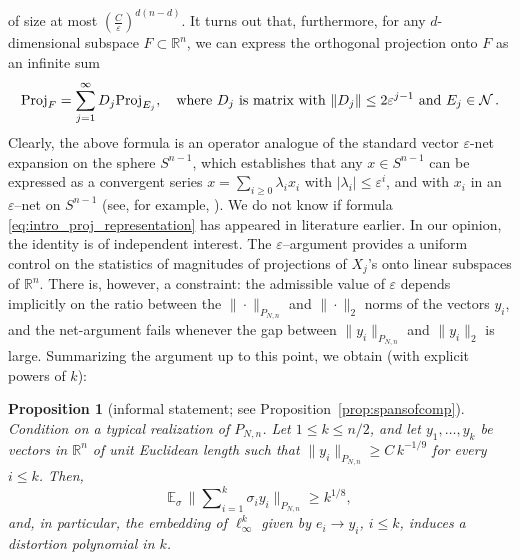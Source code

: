\documentclass[11pt]{amsart}
\newtheorem*{proposition*}{Proposition}
\theoremstyle{definition}
\theoremstyle{plain}
\newcommand{\R}{\mathbb{R}}
\def\R{{\mathbb R}}
\def\Exp{{\mathbb E}}
\def\Proj{{\rm Proj}}
\begin{document}
of size at most
$\left( \frac{C}{\varepsilon} \right)^{d(n - d)}$.
It turns out that, furthermore,
for any $d$-dimensional subspace $F\subset\R^n$, we can express the orthogonal projection onto $F$ as an infinite sum 
\begin{align}
\label{eq:intro_proj_representation}
  \Proj_{F}= \sum_{j=1}^\infty D_j \Proj_{E_{j}}, \quad \text{where } D_j \mbox{ is matrix  with } \|D_j\| \le 2 \varepsilon^{j-1} \mbox{ and } E_j \in {\mathcal N}\,.
\end{align}
Clearly, the above formula is an operator analogue of the standard vector
$\varepsilon$-net expansion on the sphere $S^{n-1}$, which establishes that any $x \in S^{n-1}$ can be expressed as a convergent series $x = \sum_{i \ge 0} \lambda_i x_i$ with $|\lambda_i| \le \varepsilon^i$, and with $x_i$ in an $\varepsilon$--net on $S^{n-1}$ (see, for example, \cite[Exercise 4.34]{Ver18}). We do not know
if formula \eqref{eq:intro_proj_representation}
has appeared in literature earlier. In our opinion, the identity 
is of independent interest.
The $\varepsilon$--argument
provides a uniform control on the
statistics of magnitudes of projections of $X_j$'s onto linear
subspaces of $\R^n$. 
There is, however, a constraint: the admissible value of $\varepsilon$ depends implicitly on the ratio between the $\|\cdot\|_{P_{N,n}}$ and $\|\cdot\|_2$ norms of the vectors $y_i$, and the net-argument
fails whenever the gap between $\|y_i\|_{P_{N,n}}$
and $\|y_i\|_2$ is large. Summarizing the argument
up to this point, we obtain (with explicit powers of $k$):
\begin{proposition*}[informal statement; see Proposition~\ref{prop:spansofcomp}]
Condition on a typical realization of $P_{N,n}$.
Let $1\leq k\leq n/2$, and let $y_1,\dots,y_k$
be vectors in $\R^n$ of unit Euclidean length
such that $\|y_i\|_{P_{N,n}}\geq C\,k^{-1/9}$
for every $i\leq k$. Then,
$$
\Exp_\sigma\,\Big\|
\sum\nolimits_{i=1}^k \sigma_i y_i
\Big\|_{P_{N,n}}\geq k^{1/8},
$$
and, in particular, the embedding of $\ell_\infty^k$
given by $e_i\longrightarrow y_i$, $i\leq k$,
induces a distortion polynomial in $k$.
\end{proposition*}
\end{document}
